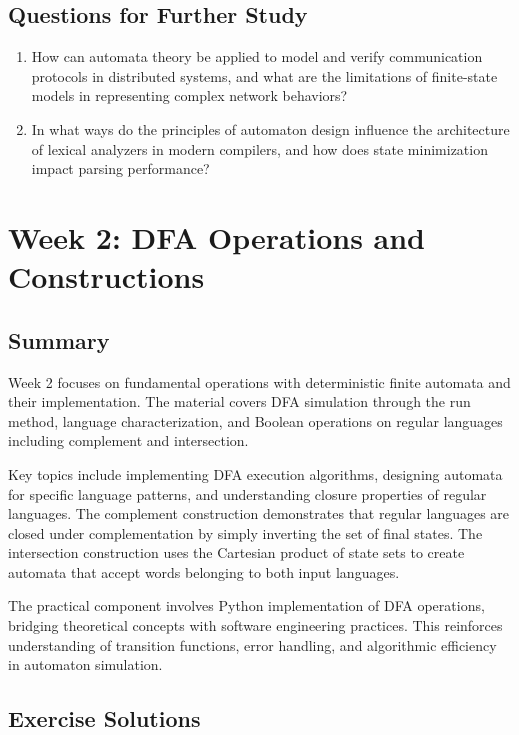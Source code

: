\documentclass{article}
\begin{document}
\subsection{Questions for Further Study}
\begin{enumerate}
    \item How can automata theory be applied to model and verify communication protocols in distributed systems, and what are the limitations of finite-state models in representing complex network behaviors?
    
    \item In what ways do the principles of automaton design influence the architecture of lexical analyzers in modern compilers, and how does state minimization impact parsing performance?
\end{enumerate}

\section{Week 2: DFA Operations and Constructions}

\subsection{Summary}
Week 2 focuses on fundamental operations with deterministic finite automata and their implementation. The material covers DFA simulation through the run method, language characterization, and Boolean operations on regular languages including complement and intersection.

Key topics include implementing DFA execution algorithms, designing automata for specific language patterns, and understanding closure properties of regular languages. The complement construction demonstrates that regular languages are closed under complementation by simply inverting the set of final states. The intersection construction uses the Cartesian product of state sets to create automata that accept words belonging to both input languages.

The practical component involves Python implementation of DFA operations, bridging theoretical concepts with software engineering practices. This reinforces understanding of transition functions, error handling, and algorithmic efficiency in automaton simulation.

\subsection{Exercise Solutions}
\end{document}
